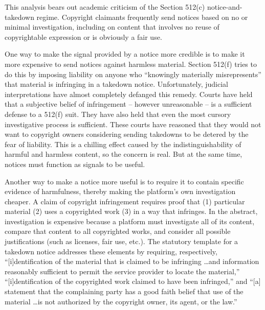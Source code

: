 This analysis bears out academic criticism of the Section 512(c) notice-and-takedown regime. Copyright claimants frequently send notices based on no or minimal investigation, including on content that involves no reuse of copyrightable expression or is obviously a fair use.

One way to make the signal provided by a notice more credible is to make it more expensive to send notices against harmless material. Section 512(f) tries to do this by imposing liability on anyone who ``knowingly materially misrepresents'' that material is infringing in a takedown notice. Unfortunately, judicial interpretations have almost completely defanged this remedy. Courts have held that a subjective belief of infringement -- however unreasonable -- is a sufficient defense to a 512(f) suit. They have also held that even the most cursory investigative process is sufficient. These courts have reasoned that they would not want to copyright owners considering sending takedowns to be detered by the fear of liability. This is a chilling effect caused by the indistinguishability of harmful and harmless content, so the concern is real. But at the same time, notices must function as signals to be useful.

Another way to make a notice more useful is to require it to contain specific evidence of harmfulness, thereby making the platform's own investigation cheaper. A claim of copyright infringement requires proof that (1) particular material (2) uses a copyrighted work (3) in a way that infringes. In the abstract, investigation is expensive because a platform must investigate all of its content, compare that content to all copyrighted works, and consider all possible justifications (such as licenses, fair use, etc.).  The statutory template for a takedown notice addresses these elements by requiring, respectively, ``[i]dentification of the material that is claimed to be infringing \ldots and information reasonably sufficient to permit the service provider to locate the material,'' ``[i]dentification of the copyrighted work claimed to have been infringed,'' and ``[a] statement that the complaining party has a good faith belief that use of the material \ldots  is not authorized by the copyright owner, its agent, or the law.''


